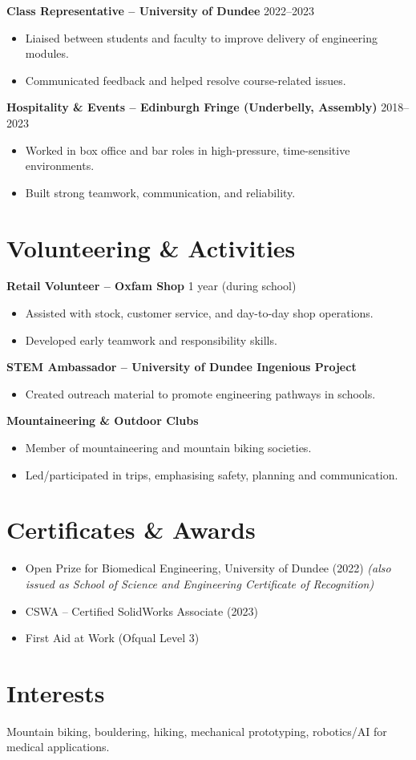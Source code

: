 \documentclass[a4paper,11pt]{article}
\begin{document}
\textbf{Class Representative – University of Dundee} \hfill 2022--2023
\begin{itemize}
    \item Liaised between students and faculty to improve delivery of engineering modules.
    \item Communicated feedback and helped resolve course-related issues.
\end{itemize}

\textbf{Hospitality \& Events – Edinburgh Fringe (Underbelly, Assembly)} \hfill 2018--2023
\begin{itemize}
    \item Worked in box office and bar roles in high-pressure, time-sensitive environments.
    \item Built strong teamwork, communication, and reliability.
\end{itemize}

\section*{Volunteering \& Activities}

\textbf{Retail Volunteer – Oxfam Shop} \hfill 1 year (during school)
\begin{itemize}
    \item Assisted with stock, customer service, and day-to-day shop operations.
    \item Developed early teamwork and responsibility skills.
\end{itemize}

\textbf{STEM Ambassador – University of Dundee Ingenious Project}
\begin{itemize}
    \item Created outreach material to promote engineering pathways in schools.
\end{itemize}

\textbf{Mountaineering \& Outdoor Clubs}
\begin{itemize}
    \item Member of mountaineering and mountain biking societies.
    \item Led/participated in trips, emphasising safety, planning and communication.
\end{itemize}

\section*{Certificates \& Awards}
\begin{itemize}
    \item Open Prize for Biomedical Engineering, University of Dundee (2022) \textit{(also issued as School of Science and Engineering Certificate of Recognition)}
    \item CSWA – Certified SolidWorks Associate (2023)
    \item First Aid at Work (Ofqual Level 3)
\end{itemize}

\section*{Interests}
Mountain biking, bouldering, hiking, mechanical prototyping, robotics/AI for medical applications.
\end{document}
